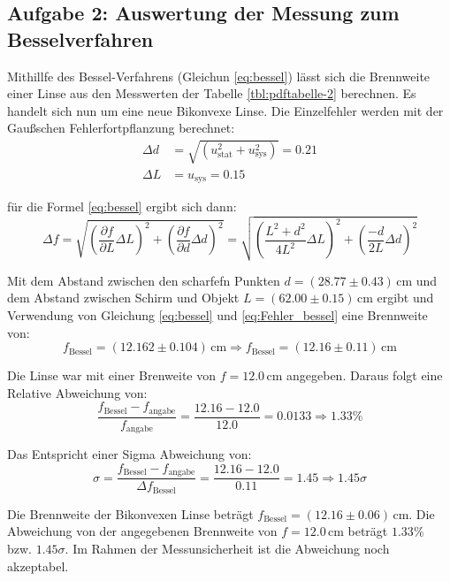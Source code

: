 \documentclass[12pt,a4paper,titlepage]{scrartcl}
\numberwithin{equation}{section}
\numberwithin{table}{section}
\numberwithin{figure}{section}
\begin{document}
\subsection{Aufgabe 2: Auswertung der Messung zum Besselverfahren}
Mithillfe des Bessel-Verfahrens (Gleichun \ref{eq:bessel}) lässt sich die Brennweite einer Linse aus den Messwerten der Tabelle \ref{tbl:pdftabelle-2} berechnen. Es handelt sich nun um eine neue Bikonvexe Linse.
Die Einzelfehler werden mit der Gaußschen Fehlerfortpflanzung berechnet\footnotemark :
\begin{align}
    \Delta d &= \sqrt{\left(u_\text{stat}^2 + u_\text{sys}^2\right)} = 0.21\\
    \Delta L &= u_\text{sys} = 0.15
\end{align}

für die Formel \ref{eq:bessel} ergibt sich dann:
\begin{equation}
    \Delta f = \sqrt{\left(\frac{\partial f}{\partial L} \Delta L\right)^2 + \left(\frac{\partial f}{\partial d} \Delta d\right)^2} = \sqrt{\left(\frac{L^2 + d^2}{4L^2} \Delta L\right)^2 + \left(\frac{-d}{2L} \Delta d\right)^2}\label{eq:Fehler_bessel}
\end{equation}

Mit dem Abstand zwischen den scharfefn Punkten $d = (28.77\pm 0.43)\,\si{\centi\meter}$ und dem Abstand zwischen Schirm und Objekt $L = (62.00\pm 0.15)\,\si{\centi\meter}$ ergibt und Verwendung von Gleichung \ref{eq:bessel} und \ref{eq:Fehler_bessel} eine Brennweite von:
\begin{equation}
    f_\text{Bessel} = (12.162\pm 0.104)\,\si{\centi\meter} \Rightarrow f_\text{Bessel} = (12.16\pm 0.11)\,\si{\centi\meter}
\end{equation}

Die Linse war mit einer Brenweite von $f = 12.0\,\si{\centi\meter}$ angegeben. Daraus folgt eine Relative Abweichung von:
\begin{equation}
    \frac{f_\text{Bessel} - f_\text{angabe}}{f_\text{angabe}} = \frac{12.16 - 12.0}{12.0} = 0.0133 \Rightarrow 1.33\%
\end{equation}

Das Entspricht einer Sigma Abweichung von:
\begin{equation}
    \sigma = \frac{f_\text{Bessel} - f_\text{angabe}}{\Delta f_\text{Bessel}} = \frac{12.16 - 12.0}{0.11} = 1.45 \Rightarrow 1.45\sigma
\end{equation}

\begin{resultbox}
    Die Brennweite der Bikonvexen Linse beträgt $f_\text{Bessel} = (12.16\pm 0.06)\,\si{\centi\meter}$.
    Die Abweichung von der angegebenen Brennweite von $f = 12.0\,\si{\centi\meter}$ beträgt $1.33\%$ bzw. $1.45\sigma$. Im Rahmen der Messunsicherheit ist die Abweichung noch akzeptabel.
\end{resultbox}
\end{document}
